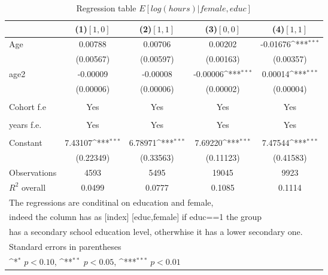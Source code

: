 \begin{table}[htbp]\centering
\def\sym#1{\ifmmode^{#1}\else\(^{#1}\)\fi}
\caption{Regression table \(E[log(hours)|female,educ]\) \label{reg4}}
\begin{tabular}{l*{4}{c}}
\toprule
                    &\multicolumn{1}{c}{(1)\([1,0]\)\label{Reg:4_h_m}}         &\multicolumn{1}{c}{(2)\([1,1]\)\label{Reg:4_h_f}}         &\multicolumn{1}{c}{(3)\([0,0]\)\label{Reg:4_l_m}}         &\multicolumn{1}{c}{(4)\([1,1]\)\label{Reg:4_l_m}}         \\
\midrule
Age                 &     0.00788         &     0.00706         &     0.00202         &    -0.01676\sym{***}\\
                    &   (0.00567)         &   (0.00597)         &   (0.00163)         &   (0.00357)         \\
\addlinespace
age2                &    -0.00009         &    -0.00008         &    -0.00006\sym{***}&     0.00014\sym{***}\\
                    &   (0.00006)         &   (0.00006)         &   (0.00002)         &   (0.00004)         \\
                    \\
                    Cohort f.e           &       Yes        &      Yes &       Yes        &      Yes \\
                                                \\
                    \addlinespace
                    years f.e.            &       Yes         &       Yes   &       Yes        &      Yes       \\
                                               \\
                    \addlinespace
Constant            &     7.43107\sym{***}&     6.78971\sym{***}&     7.69220\sym{***}&     7.47544\sym{***}\\
                    &   (0.22349)         &   (0.33563)         &   (0.11123)         &   (0.41583)         \\
\midrule
Observations        &        4593         &        5495         &       19045         &        9923         \\
$R^2$ overall       &   0.0499 &0.0777 &0.1085&0.1114\\
\bottomrule
\multicolumn{5}{l}{\footnotesize The regressions are conditinal on education and female, }\\
\multicolumn{5}{l}{\footnotesize  indeed the column has as [index]
[educ,female] if educ==1 the group  }\\
\multicolumn{5}{l}{\footnotesize has a secondary school education level, otherwhise it has a lower secondary one.}\\
\multicolumn{5}{l}{\footnotesize Standard errors in parentheses}\\
\multicolumn{5}{l}{\footnotesize \sym{*} \(p<0.10\), \sym{**} \(p<0.05\), \sym{***} \(p<0.01\)}\\
\end{tabular}
\end{table}
